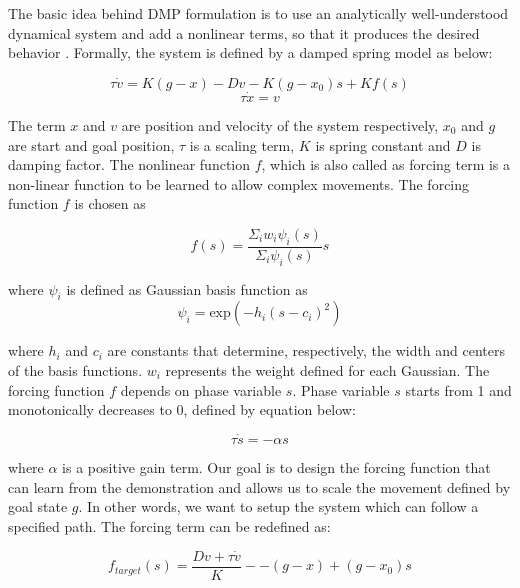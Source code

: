 \documentclass[sigconf]{acmart}
\begin{document}
The basic idea behind DMP formulation is to use an analytically well-understood dynamical system and add a nonlinear terms, so that it produces the desired behavior \cite{ijspeert2013dynamical}. Formally, the system is defined by a damped spring model as below:

\begin{equation}
	\tau	 \dot{v} = K (g - x) -D v - K (g - x_0) s + K f(s)
\end{equation}
\begin{equation}
	\tau	 \dot{x} = v
\end{equation}

The term $x$ and $v$ are position and velocity of the system respectively, $x_0$ and $g$ are start and goal position, $\tau$ is a scaling term, $K$ is spring constant and $D$ is damping factor. The nonlinear function $f$, which is also called as forcing term is a non-linear function to be learned to allow complex movements. The forcing function $f$ is chosen as

\begin{equation}
	f(s) = \frac{\Sigma_{i} w_i \psi_i(s)}{\Sigma_{i} \psi_i(s)} s
	\label{eq:forcing_func}
\end{equation}

where $\psi_i$ is defined as Gaussian basis function as
\begin{equation}
	\psi_i = \textrm{exp}\left( -h_i \left( s - c_i\right)^2 \right)
\end{equation}

where $h_i$ and $c_i$ are constants that determine, respectively, the width and centers of the basis functions. $w_i$ represents the weight defined for each Gaussian. The forcing function $f$ depends on phase variable $s$. Phase variable $s$ starts from 1 and monotonically decreases to 0, defined by equation below:

\begin{equation}
	\tau \dot{s} = - \alpha s
\end{equation}

where $\alpha$ is a positive gain term. Our goal is to design the forcing function that can learn from the demonstration and allows us to scale the movement defined by goal state $g$. In other words, we want to setup the system which can follow a specified path. The forcing term can be redefined as:

\begin{equation}
	f_{target}(s) = \frac{D v + \tau \dot{v}}{K} - - (g - x) +  (g - x_0) s
\end{equation}
\end{document}
